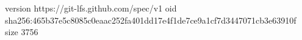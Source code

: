version https://git-lfs.github.com/spec/v1
oid sha256:465b37e5c8085c0eaac252fa401dd17e4f1de7ce9a1cf7d3447071cb3e63910f
size 3756
